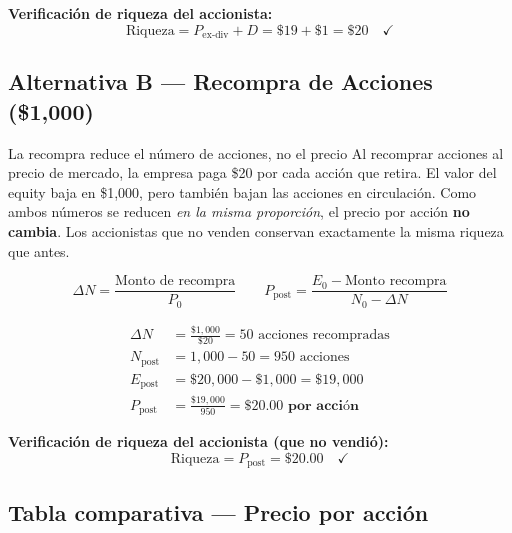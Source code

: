 \documentclass[12pt,a4paper]{article}
\begin{document}
\noindent\textbf{Verificaci\'on de riqueza del accionista:}
\[
\text{Riqueza} = P_{\text{ex-div}} + D = \$19 + \$1 = \$20 \quad \checkmark
\]

\vspace{0.8cm}

\subsection*{Alternativa B --- Recompra de Acciones (\$1{,}000)}

\begin{cajaintuicion}{La recompra reduce el n\'umero de acciones, no el precio}
Al recomprar acciones al precio de mercado, la empresa paga \$20 por cada acci\'on
que retira. El valor del equity baja en \$1{,}000, pero tambi\'en bajan las acciones
en circulaci\'on. Como ambos n\'umeros se reducen \emph{en la misma proporci\'on},
el precio por acci\'on \textbf{no cambia}. Los accionistas que no venden conservan
exactamente la misma riqueza que antes.
\end{cajaintuicion}

\begin{cajaformula}
\[
\Delta N = \frac{\text{Monto de recompra}}{P_0}
\qquad
P_{\text{post}} = \frac{E_0 - \text{Monto recompra}}{N_0 - \Delta N}
\]
\end{cajaformula}

\begin{align}
\Delta N &= \frac{\$1{,}000}{\$20} = 50 \text{ acciones recompradas} \\[6pt]
N_{\text{post}} &= 1{,}000 - 50 = 950 \text{ acciones} \\[6pt]
E_{\text{post}} &= \$20{,}000 - \$1{,}000 = \$19{,}000 \\[6pt]
P_{\text{post}} &= \frac{\$19{,}000}{950}
= \mathbf{\$20.00 \text{ por acci\'on}}
\end{align}

\noindent\textbf{Verificaci\'on de riqueza del accionista (que no vendi\'o):}
\[
\text{Riqueza} = P_{\text{post}} = \$20.00 \quad \checkmark
\]

\vspace{0.5cm}

\subsection*{Tabla comparativa --- Precio por acci\'on}
\end{document}

